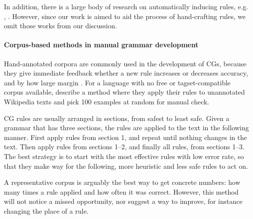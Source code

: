 In addition, there is a large body of research on automatically inducing rules, e.g. \cite{inducing_cg1996}, \cite{lindberg_eineborg98ilp}%
. However, since our work is aimed to aid the process of hand-crafting rules, we omit those works from our discussion.


\paragraph{Corpus-based methods in manual grammar development}

Hand-annotated corpora are commonly used in the development of CGs, because they give immediate feedback whether a new rule increases or decreases accuracy, and by how large margin \cite{voutilainen2004}. For a language with no free or tagset-compatible corpus available, \cite{tyers_reynolds2015} describe a method where they apply their rules to unannotated Wikipedia texts and pick 100 examples at random for manual check.

CG rules are usually arranged in sections, from safest to least safe. Given a grammar that has three sections, the rules are applied to the text in the following manner. First apply rules from section 1, and repeat until nothing changes in the text. Then apply rules from sections 1--2, and finally all rules, from sections 1--3.
The best strategy is to start with the most effective rules with low error rate, so that they make way for the following, more heuristic and less safe rules to act on.

A representative corpus is arguably the best way to get concrete numbers: how many times a rule applied and how often it was correct.
However, this method will not notice a missed opportunity, nor suggest a way to improve, for instance changing the place of a rule.




